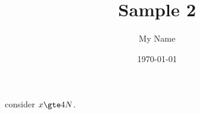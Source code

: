 \documentclass{article} %
\title{Sample 2} %
\author{My Name} %
\date{\today} %
\begin{document}
    consider $x \gte 4{N}$. 
\end{document}

